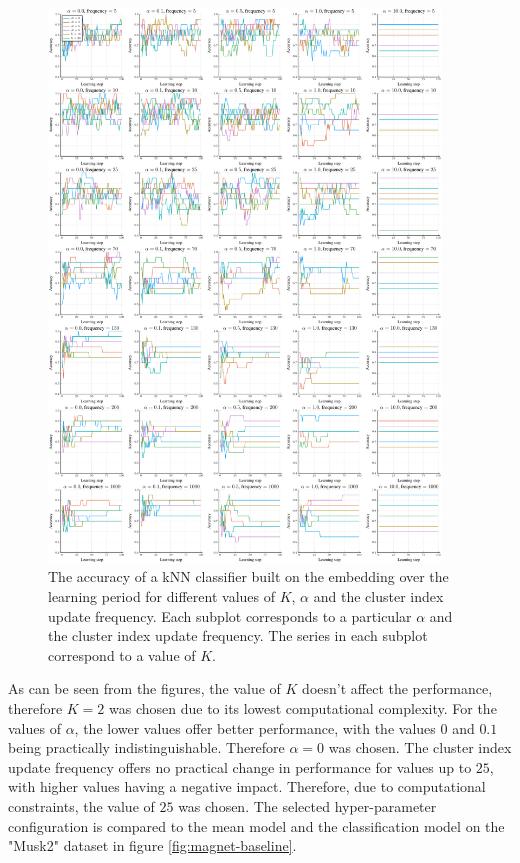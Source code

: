 \begin{figure}[h]
  \centering
  \includegraphics[width=0.93\textwidth]{images/magnet-gridsearch/accuracy/K/magnet-gridsearch-accuracy-K.pdf}
  \caption{The accuracy of a kNN classifier built on the embedding over the learning period for different values of \( K \), \( \alpha \) and the cluster index update frequency. Each subplot corresponds to a particular \( \alpha \) and the cluster index update frequency. The series in each subplot correspond to a value of \( K \).}\label{fig:magnet-gridsearch-accuracy}
\end{figure}

As can be seen from the figures, the value of \( K \) doesn't affect the performance, therefore \( K = 2 \) was chosen due to its lowest computational complexity. For the values of \( \alpha \), the lower values offer better performance, with the values \( 0 \) and \( 0.1 \) being practically indistinguishable. Therefore \( \alpha = 0 \) was chosen. The cluster index update frequency offers no practical change in performance for values up to \( 25 \), with higher values having a negative impact. Therefore, due to computational constraints, the value of \( 25 \) was chosen. The selected hyper-parameter configuration is compared to the mean model and the classification model on the "Musk2" dataset in figure \ref{fig:magnet-baseline}.

